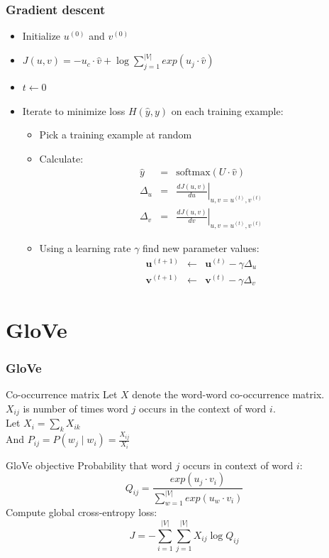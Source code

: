 \begin{frame}
\frametitle{Gradient descent}
\begin{itemize}[<+->]
\item Initialize $u^{(0)}$ and $v^{(0)}$ 
\item $J(u,v) = - u_c \cdot \hat{v} + \log \sum_{j=1}^{|V|} exp(u_j \cdot \hat{v})$
\item $t \leftarrow 0$
\item Iterate to minimize loss $H(\hat{y}, y)$ on each training example:
\begin{itemize}[<+->]
\item Pick a training example at random
\item Calculate: 
\begin{eqnarray*}
	\hat{y} &=& \textrm{softmax}(U \cdot \hat{v}) \\
	\Delta_u &=& \left. \frac{d J(u,v)}{d u}  \right|_{u,v = u^{(t)}, v^{(t)}} \\
	\Delta_v &=& \left. \frac{d J(u,v)}{d v}  \right|_{u,v = u^{(t)}, v^{(t)}}
\end{eqnarray*}
\item Using a learning rate $\gamma$ find new parameter values:
\begin{eqnarray*}
	\textbf{u}^{(t+1)} &\leftarrow& \textbf{u}^{(t)} - \gamma \Delta_u \\
	\textbf{v}^{(t+1)} &\leftarrow& \textbf{v}^{(t)} - \gamma \Delta_v
\end{eqnarray*}
\end{itemize}
\end{itemize}
\end{frame}

\section{GloVe}
\frame{\tableofcontents[currentsection]}

\begin{frame}
\frametitle{GloVe}
\begin{alertblock}{Co-occurrence matrix}
Let $X$ denote the word-word co-occurrence matrix.\\
$X_{ij}$ is number of times word $j$ occurs in the context of word $i$.\\
Let $X_i = \sum_k X_{ik}$ \\
And $P_{ij} = P(w_j \mid w_i) = \frac{X_{ij}}{X_i}$	
\end{alertblock}
\pause
\begin{alertblock}{GloVe objective}
Probability that word $j$ occurs in context of word $i$:
\[ Q_{ij} = \frac{exp(u_j \cdot v_i)}{\sum_{w=1}^{|V|} exp(u_w \cdot v_i) } \]
Compute global cross-entropy loss:
\[ J = - \sum_{i=1}^{|V|} \sum_{j=1}^{|V|} X_{ij} \log Q_{ij} \]
\end{alertblock}
\end{frame}

